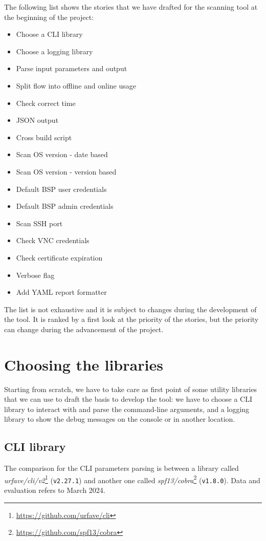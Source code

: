 The following list shows the stories that we have drafted for the scanning tool at the beginning of the project:
\begin{itemize}
  \item Choose a CLI library
  \item Choose a logging library
  \item Parse input parameters and output
  \item Split flow into offline and online usage
  \item Check correct time
  \item JSON output
  \item Cross build script
  \item Scan OS version - date based
  \item Scan OS version - version based
  \item Default BSP user credentials
  \item Default BSP admin credentials
  \item Scan SSH port
  \item Check VNC credentials
  \item Check certificate expiration
  \item Verbose flag
  \item Add YAML report formatter
\end{itemize}

The list is not exhaustive and it is subject to changes during the development of the tool. It is ranked by a first look at the priority of the stories, but the priority can change during the advancement of the project.

\section{Choosing the libraries}

Starting from scratch, we have to take care as first point of some utility libraries that we can use to draft the basis to develop the tool: we have to choose a CLI library to interact with and parse the command-line arguments, and a logging library to show the debug messages on the console or in another location.

\subsection{CLI library}

The comparison for the CLI parameters parsing is between a library called \textit{urfave/cli/v2}\footnote{\url{https://github.com/urfave/cli}} (\texttt{v2.27.1}) and another one called \textit{spf13/cobra}\footnote{\url{https://github.com/spf13/cobra}} (\texttt{v1.8.0}). Data and evaluation refers to March 2024.

